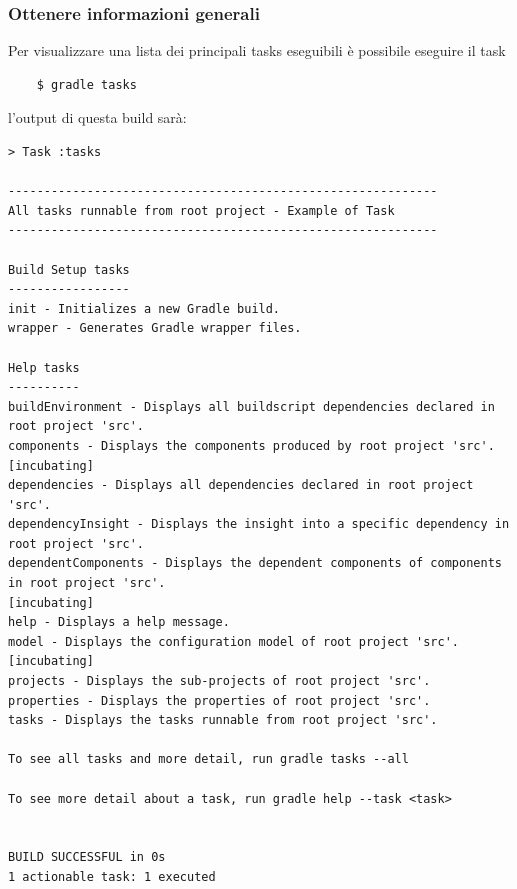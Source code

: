 \subsubsection{Ottenere informazioni generali} 
Per visualizzare una lista dei principali tasks eseguibili è possibile eseguire il task \begin{verbatim}    $ gradle tasks\end{verbatim} l'output di questa build sarà:
\begin{verbatim}
> Task :tasks 

------------------------------------------------------------
All tasks runnable from root project - Example of Task
------------------------------------------------------------

Build Setup tasks
-----------------
init - Initializes a new Gradle build.
wrapper - Generates Gradle wrapper files.

Help tasks
----------
buildEnvironment - Displays all buildscript dependencies declared in root project 'src'.
components - Displays the components produced by root project 'src'. [incubating]
dependencies - Displays all dependencies declared in root project 'src'.
dependencyInsight - Displays the insight into a specific dependency in root project 'src'.
dependentComponents - Displays the dependent components of components in root project 'src'. 
[incubating]
help - Displays a help message.
model - Displays the configuration model of root project 'src'. [incubating]
projects - Displays the sub-projects of root project 'src'.
properties - Displays the properties of root project 'src'.
tasks - Displays the tasks runnable from root project 'src'.

To see all tasks and more detail, run gradle tasks --all

To see more detail about a task, run gradle help --task <task>


BUILD SUCCESSFUL in 0s
1 actionable task: 1 executed
\end{verbatim}

